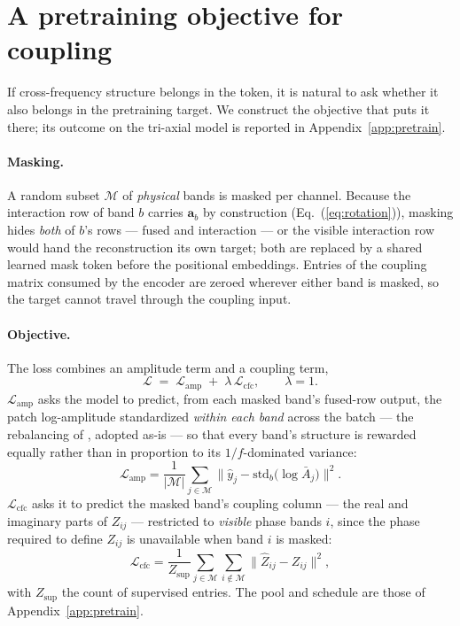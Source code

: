 \section{A pretraining objective for coupling}
\label{app:objective}

If cross-frequency structure belongs in the token, it is natural to ask
whether it also belongs in the pretraining target. We construct the
objective that puts it there; its outcome on the tri-axial model is
reported in Appendix~\ref{app:pretrain}.

\paragraph{Masking.} A random subset $\mathcal{M}$ of \emph{physical}
bands is masked per channel. Because the interaction row of band $b$
carries $\mathbf{a}_b$ by construction (Eq.~(\ref{eq:rotation})), masking
hides \emph{both} of $b$'s rows --- fused and interaction --- or the
visible interaction row would hand the reconstruction its own target; both
are replaced by a shared learned mask token before the positional
embeddings. Entries of the coupling matrix consumed by the encoder are
zeroed wherever either band is masked, so the target cannot travel through
the coupling input.

\paragraph{Objective.} The loss combines an amplitude term and a coupling
term,
\begin{equation}
\mathcal{L} \;=\; \mathcal{L}_{\mathrm{amp}}
\;+\; \lambda\, \mathcal{L}_{\mathrm{cfc}},
\qquad \lambda = 1.
\label{eq:objective}
\end{equation}
$\mathcal{L}_{\mathrm{amp}}$ asks the model to predict, from each masked
band's fused-row output, the patch log-amplitude standardized \emph{within
each band} across the batch --- the rebalancing of
\citet{yu2026understanding}, adopted as-is --- so that every band's
structure is rewarded equally rather than in proportion to its
$1/f$-dominated variance:
\begin{equation}
\mathcal{L}_{\mathrm{amp}} = \frac{1}{|\mathcal{M}|}
\sum_{j \in \mathcal{M}}
\bigl\| \hat{y}_j - \mathrm{std}_b\!\bigl(\log \bar A_j\bigr) \bigr\|^2 .
\label{eq:lamp}
\end{equation}
$\mathcal{L}_{\mathrm{cfc}}$ asks it to predict the masked band's coupling
column --- the real and imaginary parts of $Z_{ij}$ --- restricted to
\emph{visible} phase bands $i$, since the phase required to define
$Z_{ij}$ is unavailable when band $i$ is masked:
\begin{equation}
\mathcal{L}_{\mathrm{cfc}} = \frac{1}{Z_{\mathrm{sup}}}
\sum_{j \in \mathcal{M}} \sum_{i \notin \mathcal{M}}
\bigl\| \hat{Z}_{ij} - Z_{ij} \bigr\|^2,
\label{eq:lcfc}
\end{equation}
with $Z_{\mathrm{sup}}$ the count of supervised entries. The pool and schedule are those of Appendix~\ref{app:pretrain}.
